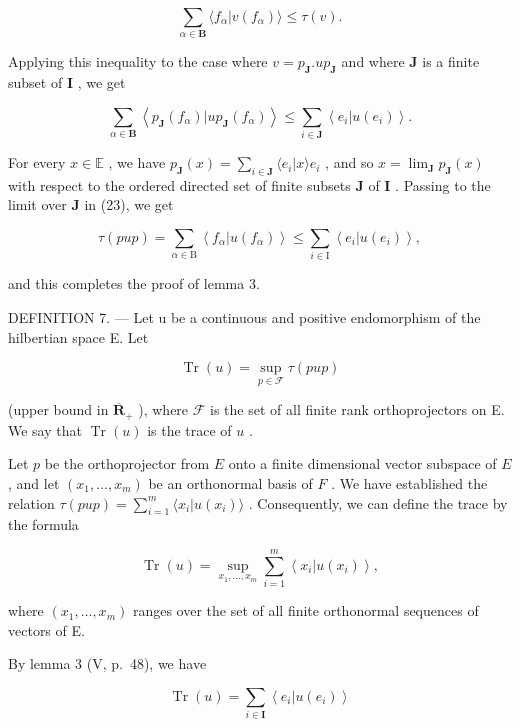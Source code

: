 \[
\sum_ {\alpha \in \mathbf {B}} \langle f _ {\alpha} | v (f _ {\alpha}) \rangle \leqslant \tau (v).
\]

Applying this inequality to the case where \(v = p_{\mathbf{J}}.up_{\mathbf{J}}\) and where \(\mathbf{J}\) is a finite subset of \(\mathbf{I}\) , we get

\[
\sum_ {\alpha \in \mathbf {B}} \left\langle p _ {\mathbf {J}} (f _ {\alpha}) | u p _ {\mathbf {J}} (f _ {\alpha}) \right\rangle \leqslant \sum_ {i \in \mathbf {J}} \left\langle e _ {i} | u (e _ {i}) \right\rangle .\tag{23}
\]

For every \(x \in \mathbb{E}\) , we have \(p_{\mathbf{J}}(x) = \sum_{i \in \mathbf{J}} \langle e_i | x \rangle e_i\) , and so \(x = \lim_{\mathbf{J}} p_{\mathbf{J}}(x)\) with respect to the ordered directed set of finite subsets \(\mathbf{J}\) of \(\mathbf{I}\) . Passing to the limit over \(\mathbf{J}\) in (23), we get

\[
\tau (p u p) = \sum_ {\alpha \in \mathrm{B}} \left\langle f _ {\alpha} | u (f _ {\alpha}) \right\rangle \leqslant \sum_ {i \in \mathrm{I}} \left\langle e _ {i} | u (e _ {i}) \right\rangle ,
\]

and this completes the proof of lemma 3.

DEFINITION 7. --- Let u be a continuous and positive endomorphism of the hilbertian space E. Let

\[
\operatorname{Tr} (u) = \sup _ {p \in \mathcal {F}} \tau (p u p)\tag{24}
\]

(upper bound in \(\overline{\mathbf{R}}_+\) ), where \(\mathcal{F}\) is the set of all finite rank orthoprojectors on E. We say that \(\operatorname{Tr}(u)\) is the trace of \(u\) .

Let \(p\) be the orthoprojector from \(E\) onto a finite dimensional vector subspace of \(E\) , and let \((x_1, \ldots, x_m)\) be an orthonormal basis of \(F\) . We have established the relation \(\tau(pup) = \sum_{i=1}^{m} \langle x_i | u(x_i) \rangle\) . Consequently, we can define the trace by the formula

\[
\operatorname{Tr} (u) = \sup _ {x _ {1}, \dots , x _ {m}} \sum_ {i = 1} ^ {m} \left\langle x _ {i} | u (x _ {i}) \right\rangle ,\tag{24'}
\]

where \((x_{1},\dots,x_{m})\) ranges over the set of all finite orthonormal sequences of vectors of E.

By lemma 3 (V, p.~48), we have

\[
\operatorname{Tr} (u) = \sum_ {i \in \mathbf {I}} \left\langle e _ {i} | u (e _ {i}) \right\rangle\tag{25}
\]


